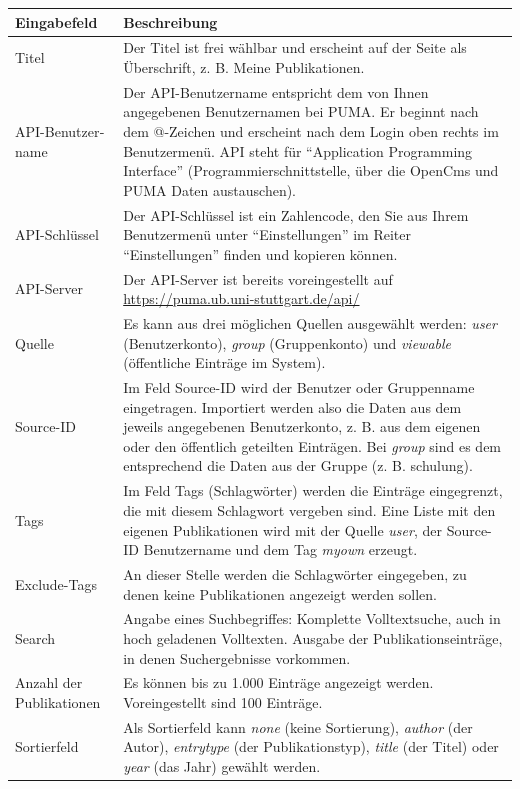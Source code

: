 \begin{longtabu}{|X|p{7cm}|}\hline
\bfseries Eingabefeld &\bfseries Beschreibung\\ \hline
Titel& 	Der Titel ist frei wählbar und erscheint auf der Seite als Überschrift, z. B. Meine Publikationen. \\ \hline
API-Benutzer­­name &	Der API-Benutzername entspricht dem von Ihnen angegebenen Benutzernamen bei PUMA. Er beginnt nach dem @-Zeichen und erscheint nach dem Login oben rechts im Benutzermenü. API steht für \enquote{Application Programming Interface} (Programmierschnittstelle, über die OpenCms und PUMA Daten austauschen).\\ \hline
API-Schlüssel &	Der API-Schlüs­sel ist ein Zahlencode, den Sie aus Ihrem Benutzermenü unter \enquote{Einstellungen} im Reiter \enquote{Einstellungen} finden und kopieren können.\\ \hline
API-Server &	Der API-Server ist bereits voreingestellt auf \url{https://puma.ub.uni-stuttgart.de/api/}\\ \hline
Quelle & Es kann aus drei möglichen Quellen ausgewählt werden: \textit{user} (Benutzerkonto), \textit{group} (Gruppenkonto) und \textit{viewable} (öffentliche Einträge im System).\\ \hline
Source-ID &	Im Feld Source-ID wird der Benutzer oder Gruppenname eingetragen. Importiert werden also die Daten aus dem jeweils angegebenen Benutzerkonto, z. B. aus dem eigenen oder den öffentlich geteilten Einträgen. Bei \textit{group} sind es dem entsprechend die Daten aus der Gruppe (z. B. schulung).\\ \hline
Tags &	Im Feld Tags (Schlagwörter) werden die Einträge eingegrenzt, die mit diesem Schlagwort vergeben sind. Eine Liste mit den eigenen Publikationen wird mit der Quelle \textit{user}, der Source-ID Benutzername und dem Tag \textit{myown} erzeugt.\\ \hline
Exclude-Tags& An dieser Stelle werden die Schlagwörter eingegeben, zu denen keine Publikationen angezeigt werden sollen.\\ \hline
Search &	Angabe eines Suchbegriffes: Komplette Volltextsuche, auch in hoch geladenen Volltexten. Ausgabe der Publikationseinträge, in denen Suchergebnisse vorkommen.\\ \hline
Anzahl der Publikationen &	Es können bis zu 1.000 Einträge angezeigt werden. Voreingestellt sind 100 Einträge.\\ \hline
Sortierfeld &	Als Sortierfeld kann \textit{none} (keine Sortierung), \textit{author} (der Autor), \textit{entrytype} (der Publikationstyp), \textit{title} (der Titel) oder \textit{year} (das Jahr) gewählt werden.\\ \hline

\end{longtabu}
